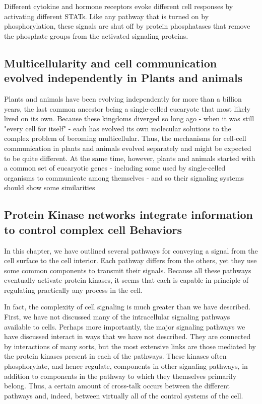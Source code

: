 Different cytokine and hormone receptors evoke different cell responses
by activating different STATs. Like any pathway that is turned on by
phosphorylation, these signals are shut off by protein phosphatases that
remove the phosphate groups from the activated signaling proteins.

\subsection{Multicellularity and cell communication evolved independently in Plants and animals}

Plants and animals have been evolving independently for more than a
billion years, the last common ancestor being a single-celled eucaryote
that most likely lived on its own. Because these kingdoms diverged so
long ago - when it was still "every cell for itself" - each has evolved its
own molecular solutions to the complex problem of becoming multicellular. 
Thus, the mechanisms for cell-cell communication in plants and
animals evolved separately and might be expected to be quite different.
At the same time, however, plants and animals started with a common
set of eucaryotic genes - including some used by single-celled organisms 
to communicate among themselves - and so their signaling systems
should show some similarities

\subsection{Protein Kinase networks integrate information to control complex cell Behaviors}

In this chapter, we have outlined several pathways for conveying a signal 
from the cell surface to the cell interior. Each pathway differs from the others, yet they use
some common components to transmit their signals. Because all these
pathways eventually activate protein kinases, it seems that each is capable 
in principle of regulating practically any process in the cell.

In fact, the complexity of cell signaling is much greater than we have
described. First, we have not discussed many of the intracellular signaling 
pathways available to cells.
Perhaps more importantly, the major signaling pathways we have discussed 
interact in ways that we have not described. They are connected
by interactions of many sorts, but the most extensive links are those
mediated by the protein kinases present in each of the pathways. These
kinases often phosphorylate, and hence regulate, components in other
signaling pathways, in addition to components in the pathway to which
they themselves primarily belong. Thus, a certain amount of cross-talk
occurs between the different pathways and, indeed,
between virtually all of the control systems of the cell.

